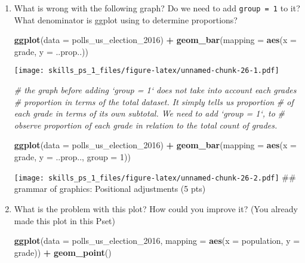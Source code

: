 \documentclass[
]{article}
\newenvironment{Shaded}{\begin{snugshade}}{\end{snugshade}}
\newcommand{\CommentTok}[1]{\textcolor[rgb]{0.56,0.35,0.01}{\textit{#1}}}
\newcommand{\DataTypeTok}[1]{\textcolor[rgb]{0.13,0.29,0.53}{#1}}
\newcommand{\DecValTok}[1]{\textcolor[rgb]{0.00,0.00,0.81}{#1}}
\newcommand{\KeywordTok}[1]{\textcolor[rgb]{0.13,0.29,0.53}{\textbf{#1}}}
\newcommand{\NormalTok}[1]{#1}
\newcommand{\OperatorTok}[1]{\textcolor[rgb]{0.81,0.36,0.00}{\textbf{#1}}}
\newcommand{\StringTok}[1]{\textcolor[rgb]{0.31,0.60,0.02}{#1}}
\begin{document}
\begin{enumerate}
\def\labelenumi{\arabic{enumi}.}
\item
  What is wrong with the following graph? Do we need to add
  \texttt{group\ =\ 1} to it? What denominator is ggplot using to
  determine proportions?

\begin{Shaded}
\begin{Highlighting}[]
\KeywordTok{ggplot}\NormalTok{(}\DataTypeTok{data =}\NormalTok{ polls_us_election_}\DecValTok{2016}\NormalTok{) }\OperatorTok{+}\StringTok{ }
\StringTok{  }\KeywordTok{geom_bar}\NormalTok{(}\DataTypeTok{mapping =} \KeywordTok{aes}\NormalTok{(}\DataTypeTok{x =}\NormalTok{ grade, }\DataTypeTok{y =}\NormalTok{ ..prop..))}
\end{Highlighting}
\end{Shaded}

  \texttt{[image: skills\_ps\_1\_files/figure-latex/unnamed-chunk-26-1.pdf]}

\begin{Shaded}
\begin{Highlighting}[]
\CommentTok{# the graph before adding `group = 1` does not take into account each grades}
\CommentTok{# proportion in terms of the total dataset. It simply tells us proportion}
\CommentTok{# of each grade in terms of its own subtotal. We need to add `group = 1`, to}
\CommentTok{# observe proportion of each grade in relation to the total count of grades.}

\KeywordTok{ggplot}\NormalTok{(}\DataTypeTok{data =}\NormalTok{ polls_us_election_}\DecValTok{2016}\NormalTok{) }\OperatorTok{+}\StringTok{ }
\StringTok{  }\KeywordTok{geom_bar}\NormalTok{(}\DataTypeTok{mapping =} \KeywordTok{aes}\NormalTok{(}\DataTypeTok{x =}\NormalTok{ grade, }\DataTypeTok{y =}\NormalTok{ ..prop.., }\DataTypeTok{group =} \DecValTok{1}\NormalTok{))}
\end{Highlighting}
\end{Shaded}

  \texttt{[image: skills\_ps\_1\_files/figure-latex/unnamed-chunk-26-2.pdf]}
  \#\# grammar of graphics: Positional adjustments (5 pts)
\item
  What is the problem with this plot? How could you improve it? (You
  already made this plot in this Pset)

\begin{Shaded}
\begin{Highlighting}[]
\KeywordTok{ggplot}\NormalTok{(}\DataTypeTok{data =}\NormalTok{ polls_us_election_}\DecValTok{2016}\NormalTok{, }
       \DataTypeTok{mapping =} \KeywordTok{aes}\NormalTok{(}\DataTypeTok{x =}\NormalTok{ population, }\DataTypeTok{y =}\NormalTok{ grade)) }\OperatorTok{+}\StringTok{ }
\StringTok{  }\KeywordTok{geom_point}\NormalTok{()}
\end{Highlighting}
\end{Shaded}


\end{enumerate}
\end{document}
